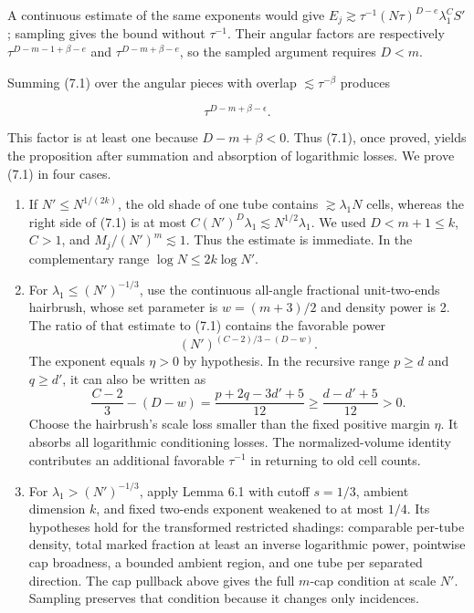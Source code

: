 \documentclass[
  11pt,
  a4paper,
]{article}
\begin{document}
A continuous estimate of the same exponents would give
\(E_j\gtrsim\tau^{-1}(N\tau)^{D-e}\lambda_1^CS'\); sampling gives the
bound without \(\tau^{-1}\). Their angular factors are respectively
\(\tau^{D-m-1+\beta-e}\) and \(\tau^{D-m+\beta-e}\), so the sampled
argument requires \(D<m\).

Summing (7.1) over the angular pieces with overlap
\(\lesssim\tau^{-\beta}\) produces

\[
\tau^{D-m+\beta-\epsilon}.
\]

This factor is at least one because \(D-m+\beta<0\). Thus (7.1), once
proved, yields the proposition after summation and absorption of
logarithmic losses. We prove (7.1) in four cases.

\begin{enumerate}
\def\labelenumi{\arabic{enumi}.}
\item
  If \(N'\le N^{1/(2k)}\), the old shade of one tube contains
  \(\gtrsim\lambda_1N\) cells, whereas the right side of (7.1) is at
  most \(C(N')^D\lambda_1\lesssim N^{1/2}\lambda_1\). We used
  \(D<m+1\le k\), \(C>1\), and \(M_j/(N')^m\lesssim1\). Thus the
  estimate is immediate. In the complementary range
  \(\log N\le2k\log N'\).
\item
  For \(\lambda_1\le(N')^{-1/3}\), use the continuous all-angle
  fractional unit-two-ends hairbrush, whose set parameter is
  \(w=(m+3)/2\) and density power is 2. The ratio of that estimate to
  (7.1) contains the favorable power \[
  (N')^{(C-2)/3-(D-w)}.
  \] The exponent equals \(\eta>0\) by hypothesis. In the recursive
  range \(p\ge d\) and \(q\ge d'\), it can also be written as \[
  \frac{C-2}{3}-(D-w)
  =\frac{p+2q-3d'+5}{12}
  \ge\frac{d-d'+5}{12}>0.                        \tag{7.2}\label{eq:7.2}
  \] Choose the hairbrush's scale loss smaller than the fixed positive
  margin \(\eta\). It absorbs all logarithmic conditioning losses. The
  normalized-volume identity contributes an additional favorable
  \(\tau^{-1}\) in returning to old cell counts.
\item
  For \(\lambda_1>(N')^{-1/3}\), apply Lemma 6.1 with cutoff \(s=1/3\),
  ambient dimension \(k\), and fixed two-ends exponent weakened to at
  most \(1/4\). Its hypotheses hold for the transformed restricted
  shadings: comparable per-tube density, total marked fraction at least
  an inverse logarithmic power, pointwise cap broadness, a bounded
  ambient region, and one tube per separated direction. The cap pullback
  above gives the full \(m\)-cap condition at scale \(N'\). Sampling
  preserves that condition because it changes only incidences.


\end{enumerate}
\end{document}
